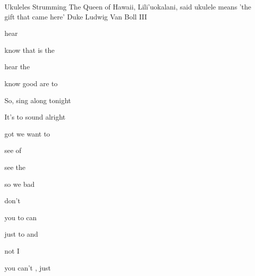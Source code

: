 \begin{SBSong}{Ukuleles Strumming}
  {The Queen of Hawaii, Lili'uokalani, said ukulele means 'the gift that came here'}
  {Duke Ludwig Van Boll III}
  \begin{SBVerse}
     hear  
    
     know that  is  the 
    
     hear the   
    
     know good  are  to 
  \end{SBVerse}
  \begin{SBChorus}
    So,  sing along tonight
    
    It's  to sound alright

     got  we want to 
  \end{SBChorus}
  \begin{SBVerse}
     see  of  

     see the   
    
     so   we  bad
    
     don't   
  \end{SBVerse}
  \begin{SBVerse}
     you  to  can 
    
     just  to  and 
    
     not  I  
    
     you can't ,  just 
  \end{SBVerse}
\end{SBSong}


